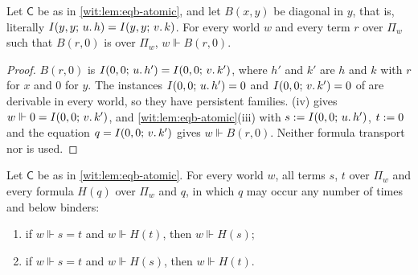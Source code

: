 \begin{lemma}
\label{wit:lem:eqb-zero}
Let $\mathsf{C}$ be as in \cref{wit:lem:eqb-atomic}, and let $B(x,y)$ be
diagonal in $y$, that is, literally $I(y,y;\,u.\,h)=I(y,y;\,v.\,k)$.  For
every world $w$ and every term $r$ over $\Pi_w$ such that $B(r,0)$ is over
$\Pi_w$, $w\Vdash B(r,0)$.
\end{lemma}

\begin{proof}
$B(r,0)$ is $I(0,0;\,u.\,h')=I(0,0;\,v.\,k')$, where $h'$ and $k'$ are $h$
and $k$ with $r$ for $x$ and $0$ for $y$.  The instances
$I(0,0;\,u.\,h')=0$ and $I(0,0;\,v.\,k')=0$ of  are derivable in
every world, so they have persistent families.  (iv)
gives $w\Vdash 0=I(0,0;\,v.\,k')$, and \cref{wit:lem:eqb-atomic}(iii) with
$s\mathrel{:=}I(0,0;\,u.\,h')$, $t\mathrel{:=} 0$ and the equation
$q=I(0,0;\,v.\,k')$ gives $w\Vdash B(r,0)$.  Neither formula transport nor
 is used.
\end{proof}

\begin{lemma}
\label{wit:lem:eqb-transport}
Let $\mathsf{C}$ be as in \cref{wit:lem:eqb-atomic}.  For every world $w$,
all terms $s$, $t$ over $\Pi_w$ and every formula $H(q)$ over $\Pi_w$ and $q$,
in which $q$ may occur any number of times and below binders:
\begin{enumerate}[label=\textup{(\roman*)}]
\item if $w\Vdash s=t$ and $w\Vdash H(t)$, then $w\Vdash H(s)$;
\item if $w\Vdash s=t$ and $w\Vdash H(s)$, then $w\Vdash H(t)$.
\end{enumerate}
\end{lemma}

